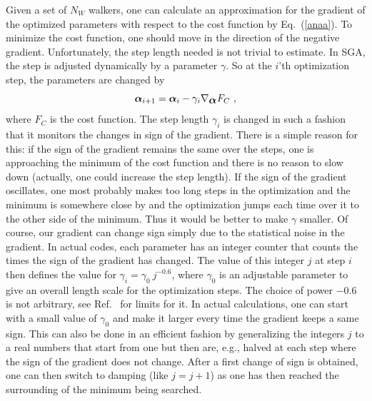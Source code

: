 \documentclass{article}
\newcommand{\balpha}{\mbox{\boldmath $\alpha$}}
\begin{document}
Given a set of $N_W$ walkers, one can calculate an approximation for
the gradient of the optimized parameters with respect to the cost
function by Eq.~(\ref{anaa}). To minimize the cost function, one
should move in the direction of the negative gradient. Unfortunately,
the step length needed is not trivial to estimate. In SGA, the step is
adjusted dynamically by a parameter $\gamma$.  So at the $i$'th
optimization step, the parameters are changed by
\begin{equation}
\balpha_{i+1}=\balpha_i-\gamma_i \nabla_{\balpha} F_C \ ,
\end{equation}
where $F_C$ is the cost function. The step length $\gamma_i$ is
changed in such a fashion that it monitors the changes in sign of the
gradient. There is a simple reason for this: if the sign of the
gradient remains the same over the steps, one is approaching the
minimum of the cost function and there is no reason to slow down
(actually, one could increase the step length). If the sign of the
gradient oscillates, one most probably makes too long steps in the
optimization and the minimum is somewhere close by and the
optimization jumps each time over it to the other side of the
minimum. Thus it would be better to make $\gamma$ smaller. Of course,
our gradient can change sign simply due to the statistical noise in
the gradient. In actual codes, each parameter has an integer counter
that counts the times the sign of the gradient has changed. The value
of this integer $j$ at step $i$ then defines the value for
$\gamma_i=\gamma_0 \ j^{-0.6}$, where $\gamma_0$ is an adjustable
parameter to give an overall length scale for the optimization
steps. The choice of power $-0.6$ is not arbitrary, see
Ref.~ for limits for it. In actual calculations, one
can start with a small value of $\gamma_0$ and make it larger every
time the gradient keeps a same sign. This can also be done in an
efficient fashion by generalizing the integers $j$ to a real numbers
that start from one but then are, e.g., halved at each step where the
sign of the gradient does not change. After a first change of sign is
obtained, one can then switch to damping (like $j=j+1$) as one has
then reached the surrounding of the minimum being searched.
\end{document}
